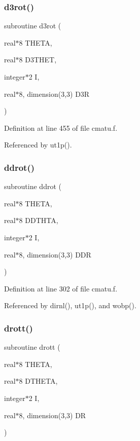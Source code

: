\subsubsection{\texorpdfstring{d3rot()}{d3rot()}}
{\footnotesize\ttfamily subroutine d3rot (\begin{DoxyParamCaption}\item[{real$\ast$8}]{T\+H\+E\+TA,  }\item[{real$\ast$8}]{D3\+T\+H\+ET,  }\item[{integer$\ast$2}]{I,  }\item[{real$\ast$8, dimension(3,3)}]{D3R }\end{DoxyParamCaption})}



Definition at line 455 of file cmatu.\+f.



Referenced by ut1p().

\mbox{\label{cmatu_8f_af7c3cf1d6c9db9ad09c09e0489ded485}} 
\subsubsection{\texorpdfstring{ddrot()}{ddrot()}}
{\footnotesize\ttfamily subroutine ddrot (\begin{DoxyParamCaption}\item[{real$\ast$8}]{T\+H\+E\+TA,  }\item[{real$\ast$8}]{D\+D\+T\+H\+TA,  }\item[{integer$\ast$2}]{I,  }\item[{real$\ast$8, dimension(3,3)}]{D\+DR }\end{DoxyParamCaption})}



Definition at line 302 of file cmatu.\+f.



Referenced by dirnl(), ut1p(), and wobp().

\mbox{\label{cmatu_8f_a05b4899387627a832cbcf67e652cbe40}} 
\subsubsection{\texorpdfstring{drott()}{drott()}}
{\footnotesize\ttfamily subroutine drott (\begin{DoxyParamCaption}\item[{real$\ast$8}]{T\+H\+E\+TA,  }\item[{real$\ast$8}]{D\+T\+H\+E\+TA,  }\item[{integer$\ast$2}]{I,  }\item[{real$\ast$8, dimension(3,3)}]{DR }\end{DoxyParamCaption})}



